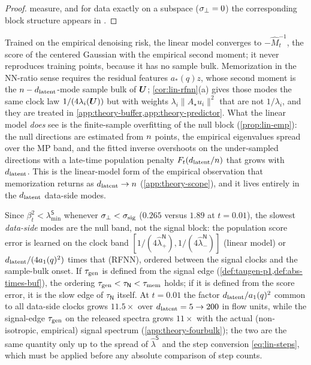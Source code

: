 \begin{proof}
measure, and for data exactly on a subspace ($\sigma_{\perp}=0$) the corresponding block structure appears in \citet{george2025dsm}.
\end{proof}

\begin{remark}\label{rem:lin-nomem}
Trained on the empirical denoising risk, the linear model converges to $-\widehat M_t^{-1}$, the score of the centered Gaussian with the empirical second moment; it never reproduces training points, because it has no sample bulk. Memorization in the NN-ratio sense requires the residual features $a_*(q)z$, whose second moment is the $n-d_{\mathrm{latent}}$-mode sample bulk of $\bm{U}$; \cref{cor:lin-rfnn}(a) gives those modes the same clock law $1/(4\lambda_i(\bm{U}))$ but with weights $\lambda_i\|A_\star u_i\|^2$ that are not $1/\lambda_i$, and they are treated in \cref{app:theory-buffer,app:theory-predictor}. What the linear model \emph{does} see is the finite-sample overfitting of the null block (\cref{prop:lin-emp}): the null directions are estimated from $n$ points, the empirical eigenvalues spread over the MP band, and the fitted inverse overshoots on the under-sampled directions with a late-time population penalty $F_t(d_{\mathrm{latent}}/n)$ that grows with $d_{\mathrm{latent}}$. This is the linear-model form of the empirical observation that memorization returns as $d_{\mathrm{latent}}\to n$ (\cref{app:theory-scope}), and it lives entirely in the $d_{\mathrm{latent}}$ data-side modes.
\end{remark}

\begin{remark}\label{rem:lin-taugen}
Since $\beta_t^2<\lambda^{\mathsf S}_{\min}$ whenever $\sigma_{\perp}<\sigma_{\mathrm{sig}}$ ($0.265$ versus $1.89$ at $t=0.01$), the slowest \emph{data-side} modes are the null band, not the signal block: the population score error is learned on the clock band $[1/(4\widehat\lambda^{\mathsf N}_+),1/(4\widehat\lambda^{\mathsf N}_-)]$ (linear model) or $d_{\mathrm{latent}}/(4a_1(q)^2)$ times that (RFNN), ordered between the signal clocks and the sample-bulk onset. If $\tau_{\mathrm{gen}}$ is defined from the signal edge (\cref{def:taugen-p1,def:abs-times-buf}), the ordering $\tau_{\mathrm{gen}}<\tau_{\mathsf N}<\tau_{\mathrm{mem}}$ holds; if it is defined from the score error, it is the slow edge of $\tau_{\mathsf N}$ itself. At $t=0.01$ the factor $d_{\mathrm{latent}}/a_1(q)^2$ common to all data-side clocks grows $11.5\times$ over $d_{\mathrm{latent}}=5\to200$ in flow units, while the signal-edge $\tau_{\mathrm{gen}}$ on the released spectra grows $11\times$ with the actual (non-isotropic, empirical) signal spectrum (\cref{app:theory-fourbulk}); the two are the same quantity only up to the spread of $\widehat\lambda^{\mathsf S}$ and the step conversion \eqref{eq:lin-steps}, which must be applied before any absolute comparison of step counts.
\end{remark}

